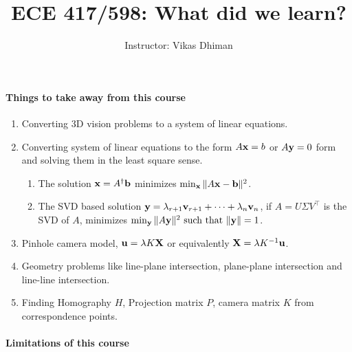 \documentclass[times,singlecolumn]{article}
\title{ECE 417/598: What did we learn?}
\author{Instructor: Vikas Dhiman}
\begin{document}
\maketitle

\paragraph{Things to take away from this course}
\begin{enumerate}
  \item Converting 3D vision problems to a system of linear equations.
  \item Converting system of  linear equations to the form $A\mathbf{x} = b$ or $A \mathbf{y} = 0$ form and
    solving them in the least square sense.
    \begin{enumerate}
      \item The solution $\mathbf{x} = A^\dagger \mathbf{b}$ minimizes $\min_{\mathbf{x}} \|A\mathbf{x}
        - \mathbf{b}\|^2$.
        \item The SVD based solution $\mathbf{y} = \lambda_{r+1} \mathbf{v}_{r+1} + \dots +
          \lambda_{n} \mathbf{v}_n$, if $A = U\Sigma V^\top$ is the SVD of $A$,
          minimizes $\min_{\mathbf{y}} \| A\mathbf{y} \|^2 \text{ such  that } \|\mathbf{y}\| = 1$.
      \end{enumerate}
  \item Pinhole camera model, $\mathbf{u} = \lambda K \mathbf{X}$ or equivalently $\mathbf{X} =
    \lambda K^{-1} \mathbf{u}$.
  \item Geometry problems like line-plane intersection, plane-plane
    intersection and line-line intersection.
  \item Finding Homography $H$, Projection matrix $P$, camera matrix $K$ from
    correspondence points.
\end{enumerate}

\paragraph{Limitations of this course}
\end{document}
